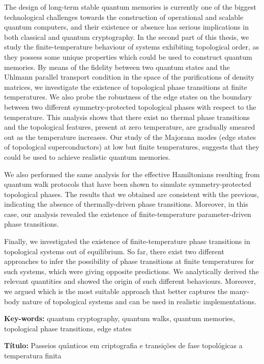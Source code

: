 \documentclass[12pt]{report}
\begin{document}
The design of long-term stable quantum memories is currently one of the biggest technological challenges towards the construction of operational and scalable quantum computers, and their existence or absence has serious implications in both classical and quantum cryptography. In the second part of this thesis, we study the finite-temperature behaviour of systems exhibiting topological order, as they possess some unique properties which could be used to construct quantum memories. By means of the fidelity between two quantum states and the Uhlmann parallel transport condition in the space of the purifications of density matrices, we investigate the existence of topological phase transitions at finite temperatures. We also probe the robustness of the edge states on the boundary between two different symmetry-protected topological phases with respect to the temperature. This analysis shows that there exist no thermal phase transitions and the topological features, present at zero temperature, are gradually smeared out as the temperature increases. Our study of the Majorana modes (edge states of topological superconductors) at low but finite temperatures, suggests that they could be used to achieve realistic quantum memories.

We also performed the same analysis for the effective Hamiltonians resulting from quantum walk protocols that have been shown to simulate symmetry-protected topological phases. The results that we obtained are consistent with the previous, indicating the absence of thermally-driven phase transitions. Moreover, in this case, our analysis revealed the existence of finite-temperature parameter-driven phase transitions.

Finally, we investigated the existence of finite-temperature phase transitions in topological systems out of equilibrium. So far, there exist two different approaches to infer the possibility of phase transitions  at finite temperatures for such systems, which were giving opposite predictions. We analytically derived the relevant quantities and showed the origin of such different behaviours. Moreover, we argued which is the most suitable approach that better captures the many-body nature of topological systems and can be used in realistic implementations.

\vfill

\begin{flushleft}
\textbf{Key-words:} quantum cryptography, quantum walks, quantum memories, topological phase transitions,  edge states
\end{flushleft}
\newpage
\noindent\textbf{T\'itulo:} Passeios qu\^{a}nticos em criptografia e transi\c{c}\~{o}es de fase topol\'{o}gicas a temperatura finita\\
\end{document}
